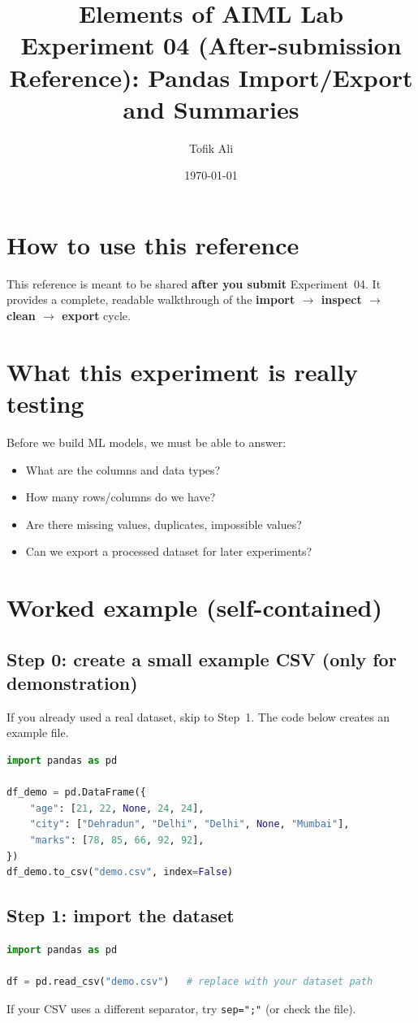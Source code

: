 \documentclass[11pt]{article}
\title{Elements of AIML Lab\\Experiment 04 (After-submission Reference): Pandas Import/Export and Summaries}
\author{Tofik Ali}
\date{\today}
\begin{document}
\maketitle
\tableofcontents

\section{How to use this reference}
This reference is meant to be shared \textbf{after you submit} Experiment~04.
It provides a complete, readable walkthrough of the \textbf{import $\rightarrow$ inspect $\rightarrow$ clean $\rightarrow$ export} cycle.

\section{What this experiment is really testing}
Before we build ML models, we must be able to answer:
\begin{itemize}[leftmargin=*]
  \item What are the columns and data types?
  \item How many rows/columns do we have?
  \item Are there missing values, duplicates, impossible values?
  \item Can we export a processed dataset for later experiments?
\end{itemize}

\section{Worked example (self-contained)}
\subsection{Step 0: create a small example CSV (only for demonstration)}
If you already used a real dataset, skip to Step~1. The code below creates an example file.
\begin{lstlisting}[language=Python]
import pandas as pd

df_demo = pd.DataFrame({
    "age": [21, 22, None, 24, 24],
    "city": ["Dehradun", "Delhi", "Delhi", None, "Mumbai"],
    "marks": [78, 85, 66, 92, 92],
})
df_demo.to_csv("demo.csv", index=False)
\end{lstlisting}

\subsection{Step 1: import the dataset}
\begin{lstlisting}[language=Python]
import pandas as pd

df = pd.read_csv("demo.csv")   # replace with your dataset path
\end{lstlisting}
If your CSV uses a different separator, try \texttt{sep=";"} (or check the file).
\end{document}
